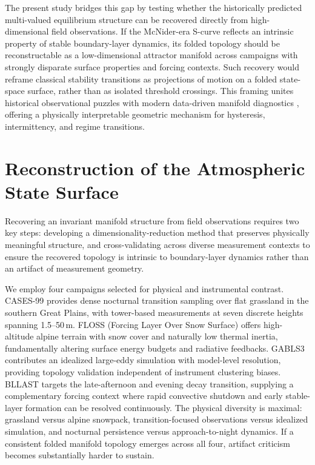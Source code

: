 \documentclass[12pt,a4paper]{article}
\begin{document}
The present study bridges this gap by testing whether the historically predicted multi-valued equilibrium structure can be recovered directly from high-dimensional field observations. If the McNider-era S-curve reflects an intrinsic property of stable boundary-layer dynamics, its folded topology should be reconstructable as a low-dimensional attractor manifold across campaigns with strongly disparate surface properties and forcing contexts. Such recovery would reframe classical stability transitions as projections of motion on a folded state-space surface, rather than as isolated threshold crossings. This framing unites historical observational puzzles with modern data-driven manifold diagnostics \citep{brunton2016, peherstorfer2016}, offering a physically interpretable geometric mechanism for hysteresis, intermittency, and regime transitions.

\section{Reconstruction of the Atmospheric State Surface}

Recovering an invariant manifold structure from field observations requires two key steps: developing a dimensionality-reduction method that preserves physically meaningful structure, and cross-validating across diverse measurement contexts to ensure the recovered topology is intrinsic to boundary-layer dynamics rather than an artifact of measurement geometry.

We employ four campaigns selected for physical and instrumental contrast. CASES-99 \citep{poulos2002} provides dense nocturnal transition sampling over flat grassland in the southern Great Plains, with tower-based measurements at seven discrete heights spanning 1.5--50\,m. FLOSS (Forcing Layer Over Snow Surface) offers high-altitude alpine terrain with snow cover and naturally low thermal inertia, fundamentally altering surface energy budgets and radiative feedbacks. GABLS3 \citep{beare2004} contributes an idealized large-eddy simulation with model-level resolution, providing topology validation independent of instrument clustering biases. BLLAST targets the late-afternoon and evening decay transition, supplying a complementary forcing context where rapid convective shutdown and early stable-layer formation can be resolved continuously. The physical diversity is maximal: grassland versus alpine snowpack, transition-focused observations versus idealized simulation, and nocturnal persistence versus approach-to-night dynamics. If a consistent folded manifold topology emerges across all four, artifact criticism becomes substantially harder to sustain.
\end{document}
